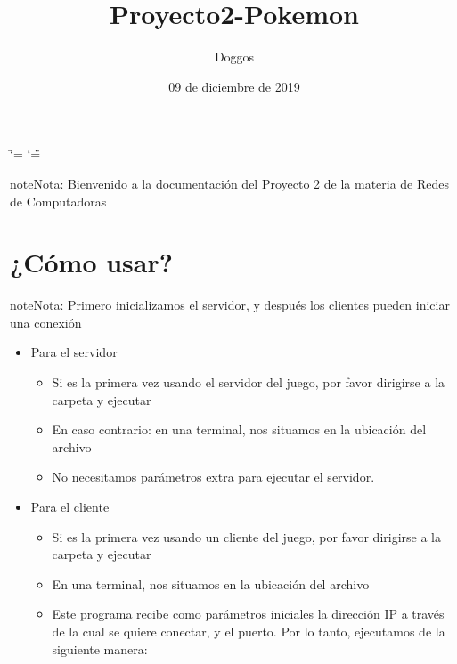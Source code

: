 \documentclass[letterpaper,10pt,spanish,openany,oneside]{sphinxmanual}
\title{Proyecto2-Pokemon}
\date{09 de diciembre de 2019}
\author{Doggos}
\begin{document}
\ifdefined\shorthandoff
  \ifnum\catcode`\=\string=\active\shorthandoff{=}\fi
  \ifnum\catcode`\"=\active{}\fi
\fi

\pagestyle{empty}
\sphinxmaketitle
\pagestyle{plain}
\sphinxtableofcontents
\pagestyle{normal}
\label{\detokenize{index::doc}}


\begin{sphinxadmonition}{note}{Nota:}
Bienvenido a la documentación del Proyecto 2 de la materia de Redes de Computadoras
\end{sphinxadmonition}


\chapter{¿Cómo usar?}
\label{\detokenize{index:como-usar}}
\begin{sphinxadmonition}{note}{Nota:}
Primero inicializamos el servidor, y después los clientes pueden iniciar una conexión
\end{sphinxadmonition}
\begin{itemize}
\item {} 
Para el servidor
\begin{itemize}
\item {} 
Si es la primera vez usando el servidor del juego, por favor dirigirse a la carpeta  y ejecutar 

\item {} 
En caso contrario: en una terminal, nos situamos en la ubicación del archivo 

\item {} 
No necesitamos parámetros extra para ejecutar el servidor. 

\end{itemize}

\item {} 
Para el cliente
\begin{itemize}
\item {} 
Si es la primera vez usando un cliente del juego, por favor dirigirse a la carpeta  y ejecutar 

\item {} 
En una terminal, nos situamos en la ubicación del archivo 

\item {} 
Este programa recibe como parámetros iniciales la dirección IP a través de la cual se quiere conectar, y el puerto. Por lo tanto, ejecutamos de la siguiente manera: 

\end{itemize}

\end{itemize}
\end{document}
